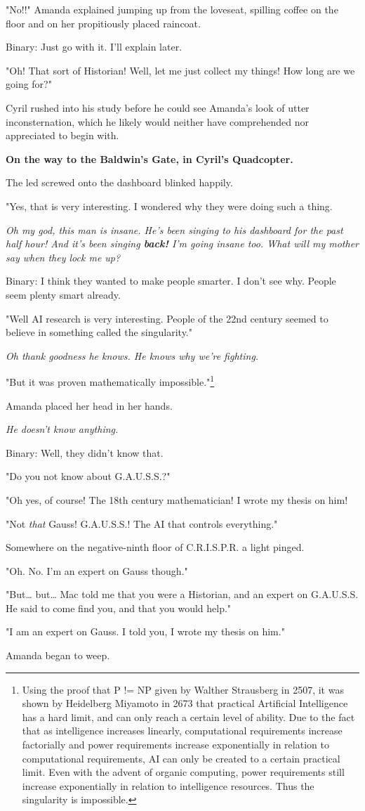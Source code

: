 \documentclass[12pt]{article}
\begin{document}
"No!!" Amanda explained jumping up from the loveseat, spilling coffee on the floor and on her propitiously placed raincoat.

Binary: Just go with it. I'll explain later.

"Oh! That sort of Historian! Well, let me just collect my things! How long are we going for?"

Cyril rushed into his study before he could see Amanda's look of utter inconsternation, which he likely would neither have comprehended nor appreciated to begin with.

\textbf{On the way to the Baldwin's Gate, in Cyril's Quadcopter.}

The led screwed onto the dashboard blinked happily.

"Yes, that is very interesting. I wondered why they were doing such a thing.

\emph{Oh my god, this man is insane. He's been singing to his dashboard for the past half hour! And it's been singing \textbf{back!} I'm going insane too. What will my mother say when they lock me up?}

Binary: I think they wanted to make people smarter. I don't see why. People seem plenty smart already.

"Well AI research is very interesting. People of the 22nd century seemed to believe in something called the singularity."

\emph{Oh thank goodness he knows. He knows why we're fighting.}

"But it was proven mathematically impossible."\footnote{Using the proof that P != NP given by Walther Strausberg in 2507, it was shown by Heidelberg Miyamoto in 2673 that practical Artificial Intelligence has a hard limit, and can only reach a certain level of ability. Due to the fact that as intelligence increases linearly, computational requirements increase factorially and power requirements increase exponentially in relation to computational requirements, AI can only be created to a certain practical limit. Even with the advent of organic computing, power requirements still increase exponentially in relation to intelligence resources. Thus the singularity is impossible.}

Amanda placed her head in her hands.

\emph{He doesn't know anything.}

Binary: Well, they didn't know that.

"Do you not know about G.A.U.S.S.?"

"Oh yes, of course! The 18th century mathematician! I wrote my thesis on him!

"Not \emph{that} Gauss! G.A.U.S.S.! The AI that controls everything."

Somewhere on the negative-ninth floor of C.R.I.S.P.R. a light pinged.

"Oh. No. I'm an expert on Gauss though."

"But\ldots{} but\ldots{} Mac told me that you were a Historian, and an expert on G.A.U.S.S. He said to come find you, and that you would help."

"I am an expert on Gauss. I told you, I wrote my thesis on him."

Amanda began to weep.
\end{document}
